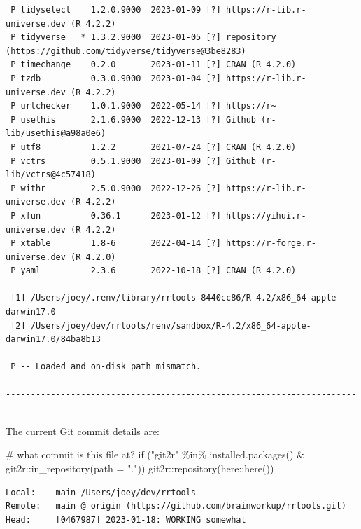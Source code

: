 \documentclass[
  super,
  preprint,
  3p]{elsarticle}
\newenvironment{Shaded}{\begin{snugshade}}{\end{snugshade}}
\newcommand{\AttributeTok}[1]{\textcolor[rgb]{0.40,0.45,0.13}{#1}}
\newcommand{\CommentTok}[1]{\textcolor[rgb]{0.37,0.37,0.37}{#1}}
\newcommand{\ControlFlowTok}[1]{\textcolor[rgb]{0.00,0.23,0.31}{#1}}
\newcommand{\FunctionTok}[1]{\textcolor[rgb]{0.28,0.35,0.67}{#1}}
\newcommand{\NormalTok}[1]{\textcolor[rgb]{0.00,0.23,0.31}{#1}}
\newcommand{\SpecialCharTok}[1]{\textcolor[rgb]{0.37,0.37,0.37}{#1}}
\newcommand{\StringTok}[1]{\textcolor[rgb]{0.13,0.47,0.30}{#1}}
\begin{document}
\begin{verbatim}
 P tidyselect    1.2.0.9000  2023-01-09 [?] https://r-lib.r-universe.dev (R 4.2.2)
 P tidyverse   * 1.3.2.9000  2023-01-05 [?] repository (https://github.com/tidyverse/tidyverse@3be8283)
 P timechange    0.2.0       2023-01-11 [?] CRAN (R 4.2.0)
 P tzdb          0.3.0.9000  2023-01-04 [?] https://r-lib.r-universe.dev (R 4.2.2)
 P urlchecker    1.0.1.9000  2022-05-14 [?] https://r~
 P usethis       2.1.6.9000  2022-12-13 [?] Github (r-lib/usethis@a98a0e6)
 P utf8          1.2.2       2021-07-24 [?] CRAN (R 4.2.0)
 P vctrs         0.5.1.9000  2023-01-09 [?] Github (r-lib/vctrs@4c57418)
 P withr         2.5.0.9000  2022-12-26 [?] https://r-lib.r-universe.dev (R 4.2.2)
 P xfun          0.36.1      2023-01-12 [?] https://yihui.r-universe.dev (R 4.2.2)
 P xtable        1.8-6       2022-04-14 [?] https://r-forge.r-universe.dev (R 4.2.0)
 P yaml          2.3.6       2022-10-18 [?] CRAN (R 4.2.0)

 [1] /Users/joey/.renv/library/rrtools-8440cc86/R-4.2/x86_64-apple-darwin17.0
 [2] /Users/joey/dev/rrtools/renv/sandbox/R-4.2/x86_64-apple-darwin17.0/84ba8b13

 P -- Loaded and on-disk path mismatch.

------------------------------------------------------------------------------
\end{verbatim}

The current Git commit details are:

\begin{Shaded}
\begin{Highlighting}[]
\CommentTok{\# what commit is this file at? }
\ControlFlowTok{if}\NormalTok{ (}\StringTok{"git2r"} \SpecialCharTok{\%in\%} \FunctionTok{installed.packages}\NormalTok{() }\SpecialCharTok{\&}\NormalTok{ git2r}\SpecialCharTok{::}\FunctionTok{in\_repository}\NormalTok{(}\AttributeTok{path =} \StringTok{"."}\NormalTok{)) git2r}\SpecialCharTok{::}\FunctionTok{repository}\NormalTok{(here}\SpecialCharTok{::}\FunctionTok{here}\NormalTok{())  }
\end{Highlighting}
\end{Shaded}

\begin{verbatim}
Local:    main /Users/joey/dev/rrtools
Remote:   main @ origin (https://github.com/brainworkup/rrtools.git)
Head:     [0467987] 2023-01-18: WORKING somewhat
\end{verbatim}


  
\end{document}
